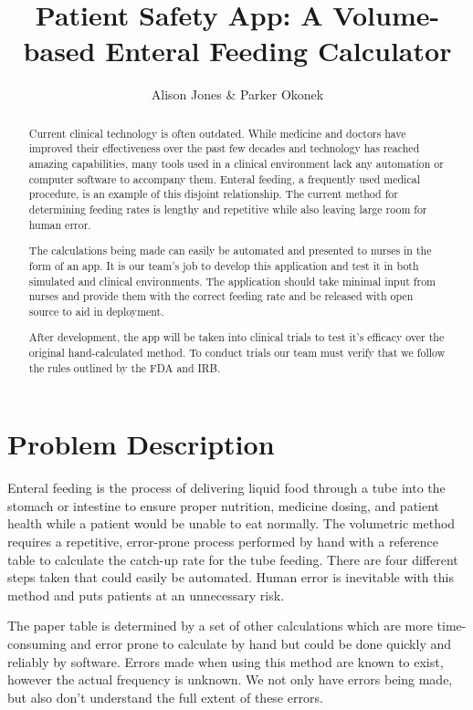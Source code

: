 \documentclass[fullpage,10pt, onecolumn, draftclsnofoot]{IEEEtran}
\begin{document}
\title{Patient Safety App: A Volume-based Enteral Feeding Calculator}
\author{Alison Jones \& Parker Okonek}
 \maketitle
 \begin{abstract}
 Current clinical technology is often outdated. While medicine and doctors have improved their 
effectiveness over the past few decades and technology has reached amazing capabilities, 
many tools used in a clinical environment lack any automation or computer software to
accompany them.  Enteral feeding, a frequently used medical procedure, is an example of 
this disjoint relationship. The current method for determining feeding rates is lengthy and repetitive
while also leaving large room for human error. 

The calculations being made
can easily be automated and presented to nurses in the form of an app. It is our team's job to
develop this application and test it in both simulated and clinical environments. The application
should take minimal input from nurses and provide them with the correct feeding rate and
be released with open source to aid in deployment.

After development, the app will be taken into clinical
 trials to test it's efficacy over the original hand-calculated method. To conduct trials our team
 must verify that we follow the rules outlined by the FDA and IRB.
 \end{abstract}
\newpage
\section{Problem Description}
Enteral feeding is the process of delivering  liquid  food through a tube into the 
stomach or intestine to ensure proper nutrition, medicine dosing, and patient health while
a patient would be unable to eat normally. The volumetric method requires a repetitive, error-prone process performed
by hand with a reference table to calculate the catch-up rate for the tube feeding. There are four different steps taken that could easily be
automated. Human error is inevitable with this method and puts patients at an unnecessary risk. 

The paper table is determined by a set of other 
calculations which are more time-consuming and error prone to calculate by hand but could
be done quickly and reliably by software. Errors made when using this method are known to exist, however the actual frequency is unknown.
We not only have errors being made, but also don't understand the full extent of these errors. 
\end{document}
